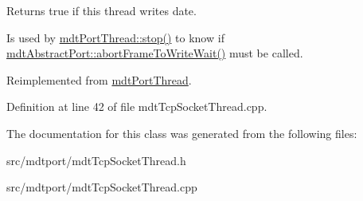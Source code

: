Returns true if this thread writes date. 

Is used by \hyperlink{classmdt_port_thread_a5746ea96689ed80179751ad1353f0b39}{mdtPortThread::stop()} to know if \hyperlink{classmdt_abstract_port_ae67c815f68317c70e398eaa86622af6b}{mdtAbstractPort::abortFrameToWriteWait()} must be called. 

Reimplemented from \hyperlink{classmdt_port_thread_a0122a12262052cf3643241a3eaa31c58}{mdtPortThread}.



Definition at line 42 of file mdtTcpSocketThread.cpp.



The documentation for this class was generated from the following files:\begin{DoxyCompactItemize}
\item 
src/mdtport/mdtTcpSocketThread.h\item 
src/mdtport/mdtTcpSocketThread.cpp\end{DoxyCompactItemize}
